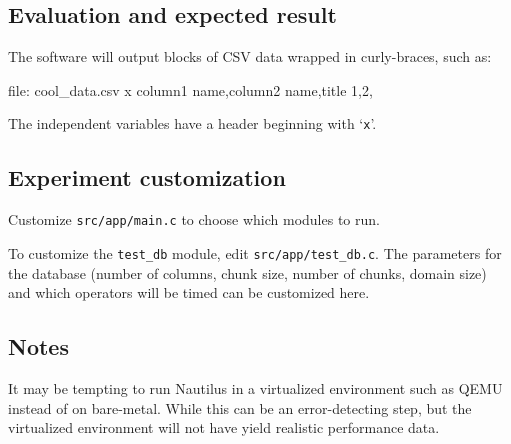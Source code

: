 \documentclass{IEEEtran}
\begin{document}
\subsection{Evaluation and expected result}

The software will output blocks of CSV data wrapped in curly-braces, such as:

\begin{shellcode}
  file: cool_data.csv {
    x column1 name,column2 name,title
    1,2,
  }
\end{shellcode}

The independent variables have a header beginning with `\texttt{x}'.

\subsection{Experiment customization}

Customize \texttt{src/app/main.c} to choose which modules to run.

To customize the \texttt{test\_db} module, edit \texttt{src/app/test\_db.c}. The parameters for the database (number of columns, chunk size, number of chunks, domain size) and which operators will be timed can be customized here.

\subsection{Notes}
It may be tempting to run Nautilus in a virtualized environment such as QEMU instead of on bare-metal. While this can be an error-detecting step, but the virtualized environment will not have yield realistic performance data.
\end{document}

